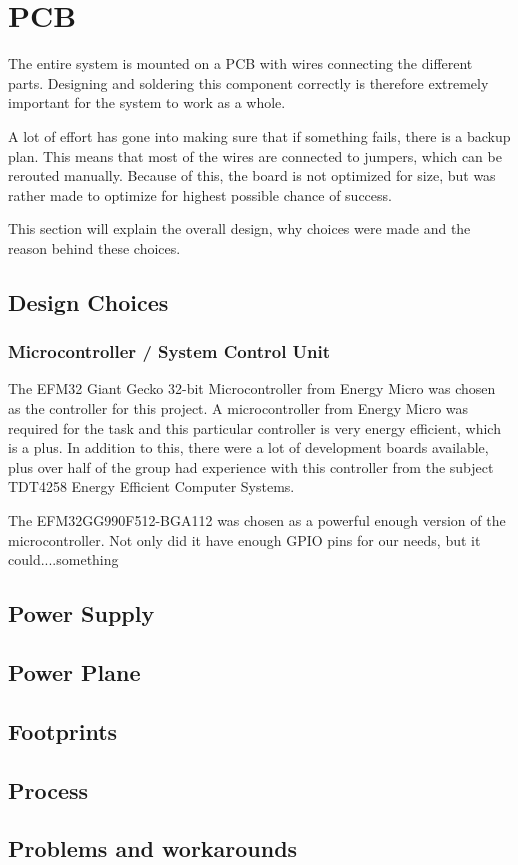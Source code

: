 \chapter{PCB}
\label{sec:pcb}

The entire system is mounted on a PCB with wires connecting the different parts.
Designing and soldering this component correctly is therefore extremely important for the system
to work as a whole.

A lot of effort has gone into making sure that if something fails, there is a backup plan.
This means that most of the wires are connected to jumpers, which can be rerouted manually.
Because of this, the board is not optimized for size, but was rather made to optimize for
highest possible chance of success.

This section will explain the overall design, why choices were made and the reason behind these choices.

\section{Design Choices}
\label{sec:pcb:design}

\subsection{Microcontroller / System Control Unit}
The EFM32 Giant Gecko 32-bit Microcontroller from Energy Micro was chosen as the controller for this project.
A microcontroller from Energy Micro was required for the task and this particular controller is
very energy efficient, which is a plus.
In addition to this, there were a lot of development boards available,
plus over half of the group had experience with this controller from the subject
TDT4258 Energy Efficient Computer Systems.

The EFM32GG990F512-BGA112 was chosen as a powerful enough version of the microcontroller.
Not only did it have enough GPIO pins for our needs, but it could....something %

\section{Power Supply}

\section{Power Plane}

\section{Footprints}

\section{Process}

\section{Problems and workarounds}
